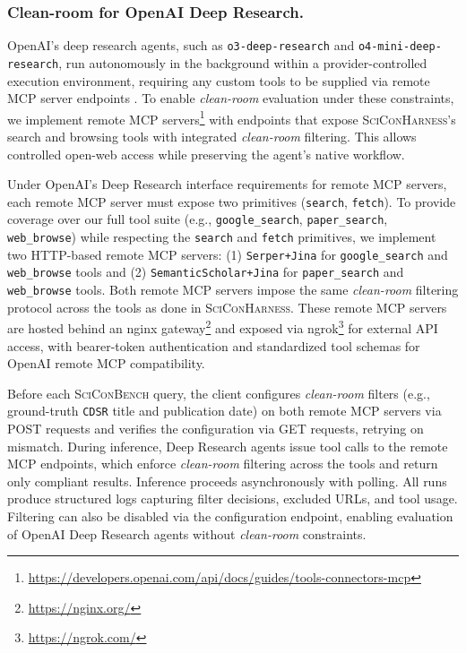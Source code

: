 \documentclass{article}
\begin{document}
\subsubsection{Clean-room for OpenAI Deep Research.} OpenAI's deep research agents, such as \texttt{o3-deep-research} and \texttt{o4-mini-deep-research}, run autonomously in the background within a provider-controlled execution environment, requiring any custom tools to be supplied via remote MCP server endpoints \cite{openai_deep_research_guide}. To enable \textit{clean-room} evaluation under these constraints, we implement remote MCP servers\footnote{\url{https://developers.openai.com/api/docs/guides/tools-connectors-mcp}} with endpoints that expose \textsc{SciConHarness}'s search and browsing tools with integrated \textit{clean-room} filtering. This allows controlled open-web access while preserving the agent’s native workflow. 

Under OpenAI's Deep Research interface requirements for remote MCP servers, each remote MCP server must expose two primitives (\texttt{search}, \texttt{fetch}). To provide coverage over our full tool suite (e.g., \texttt{google\_search}, \texttt{paper\_search}, \texttt{web\_browse}) while respecting the \texttt{search} and \texttt{fetch} primitives, we implement two HTTP-based remote MCP servers: (1) \texttt{Serper+Jina} for \texttt{google\_search} and \texttt{web\_browse} tools and (2) \texttt{SemanticScholar+Jina} for \texttt{paper\_search} and \texttt{web\_browse} tools. Both remote MCP servers impose the same \textit{clean-room} filtering protocol across the tools as done in \textsc{SciConHarness}. These remote MCP servers are hosted behind an nginx gateway\footnote{\url{https://nginx.org/}} and exposed via ngrok\footnote{\url{https://ngrok.com/}} for external API access, with bearer-token authentication and standardized tool schemas for OpenAI remote MCP compatibility.

Before each \textsc{SciConBench} query, the client configures \textit{clean-room} filters (e.g., ground-truth \texttt{CDSR} title and publication date) on both remote MCP servers via POST requests and verifies the configuration via GET requests, retrying on mismatch. During inference, Deep Research agents issue tool calls to the remote MCP endpoints, which enforce \textit{clean-room} filtering across the tools and return only compliant results. Inference proceeds asynchronously with polling. All runs produce structured logs capturing filter decisions, excluded URLs, and tool usage. Filtering can also be disabled via the configuration endpoint, enabling evaluation of OpenAI Deep Research agents without \textit{clean-room} constraints.
\end{document}
